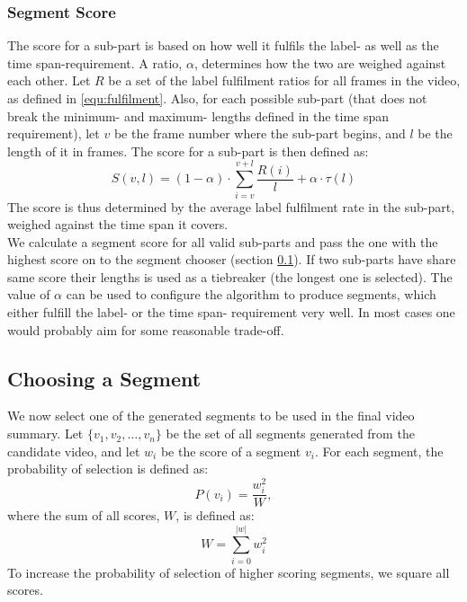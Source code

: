 \subsubsection{Segment Score}
%
The score for a sub-part is based on how well it fulfils the label- as well as the time span-requirement. A ratio, $\alpha$, determines how the two are weighed against each other. Let $R$ be a set of the label fulfilment ratios for all frames in the video, as defined in \ref{equ:fulfilment}. Also, for each possible sub-part (that does not break the minimum- and maximum- lengths defined in the time span requirement), let $v$ be the frame number where the sub-part begins, and $l$ be the length of it in frames. The score for a sub-part is then defined as:\\
%
\begin{equation}
S(v,l) =(1-\alpha) \cdot \sum_{i=v}^{v+l} \frac{R(i)}{l} + \alpha \cdot \tau(l)
\end{equation}\label{equ:segment_score}
%
The score is thus determined by the average label fulfilment rate in the sub-part, weighed against the time span it covers.\\
We calculate a segment score for all valid sub-parts and pass the one with the highest score on to the segment chooser (section \ref{sec:choosing_segment}). If two sub-parts have share same score their lengths is used as a tiebreaker (the longest one is selected). The value of $\alpha$ can be used to configure the algorithm to produce segments, which either fulfill the label- or the time span- requirement very well. In most cases one would probably aim for some reasonable trade-off.
%
%
\subsection{Choosing a Segment}\label{sec:choosing_segment}
%
We now select one of the generated segments to be used in the final video summary. Let $\{v_1,v_2,\dots,v_n\}$ be the set of all segments generated from the candidate video, and let $w_i$ be the score of a segment $v_i$. For each segment, the probability of selection is defined as:
%
\[
P(v_i) = \frac{w_i^2}{W},
\]
%
where the sum of all scores, $W$, is defined as:
%
\[
W = \sum_{i=0}^{|w|} w_i^2
\]
%
To increase the probability of selection of higher scoring segments, we square all scores.
%